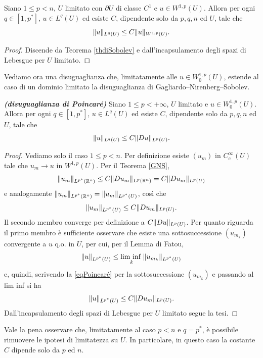\begin{proposizione}
	Siano $1 \le p < n$, $U$ limitato con $\partial U$ di classe $C^1$ e $u \in W^{1,p}(U)$. Allora per ogni $q \in \left[ 1,p^\ast\right] $, $u \in L^{q}(U)$ ed esiste $C$, dipendente solo da $p,q,n$ ed $U$, tale che 
	\[ \lVert u\rVert_{L^q(U)} \le C\lVert u\rVert_{W^{1,p}(U)}. \]
\end{proposizione}
\begin{proof}
	Discende da Teorema \eqref{thdiSobolev} e dall'incapsulamento degli spazi di Lebesgue per $U$ limitato.
\end{proof}
Vediamo ora una disuguaglianza che, limitatamente alle $u \in W^{1,p}_0(U)$, estende al caso di un dominio limitato la disuguaglianza di Gagliardo--Nirenberg--Sobolev.
\begin{teorema}\textbf{\emph{(disuguaglianza di Poincaré)}}\label{disPoincaré}
	Siano $1 \le p < +\infty$, $U$ limitato e $u \in W^{1,p}_0(U)$. Allora per ogni $q \in \left[ 1,p^\ast\right] $, $u \in L^{q}(U)$ ed esiste $C$, dipendente solo da $p,q,n$ ed $U$, tale che 
	\[ \lVert u\rVert_{L^q(U)} \le C\lVert Du\rVert_{L^p(U)}. \]
\end{teorema}
\begin{proof}
	Vediamo solo il caso $1 \le p < n$. Per definizione esiste $(u_m)$ in $C^\infty_c(U)$ tale che $u_m \to u$ in $W^{1,p}(U)$. Per il Teorema \eqref{GNS}, 
	\[ \lVert u_m\rVert_{L^{p^\ast}(\mathbb{R}^n)} \le C \lVert Du_m\rVert_{L^p(\mathbb{R}^n)} = C\lVert Du_m\rVert_{L^p(U)} \]
	e analogamente $\lVert u_m\rVert_{L^{p^\ast}(\mathbb{R}^n)} = \lVert u_m\rVert_{L^{p^\ast}(U)}$, così che
	\begin{equation}\label{eqPoincaré}
		\lVert u_m\rVert_{L^{p^\ast}(U)}\le C\lVert Du_m\rVert_{L^p(U)}.
	\end{equation}
	Il secondo membro converge per definizione a $C\lVert Du\rVert_{L^p(U)}$. Per quanto riguarda il primo membro è sufficiente osservare che esiste una sottosuccessione $(u_{m_k})$ convergente a $u$ q.o. in $U$, per cui, per il Lemma di Fatou,
	\[ \lVert u\rVert_{L^{p^\ast}(U)} \le \underset{k}{\textup{lim inf }} \lVert u_{m_k}\rVert_{L^{p^\ast}(U)} \]
	e, quindi, scrivendo la \eqref{eqPoincaré} per la sottosuccessione $(u_{m_k})$ e passando al lim inf si ha 
	\[ \lVert u\rVert_{L^{p^\ast}(U)} \le C\lVert Du_m\rVert_{L^p(U)}.\]
	Dall'incapsulamento degli spazi di Lebesgue per $U$ limitato segue la tesi.
\end{proof}
\begin{osservazione}
Vale la pena osservare che, limitatamente al caso $p<n$ e $q=p^\ast$, è possibile rimuovere le ipotesi di limitatezza su $U$. In particolare, in questo caso la costante $C$ dipende solo da $p$ ed $n$.
\end{osservazione}

